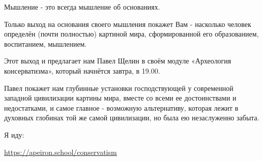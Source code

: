 Мышление - это всегда мышление об основаниях. 

Только выход на основания своего мышления покажет Вам - насколько человек
определён (почти полностью) картиной мира, сформированной его образованием,
воспитанием, мышлением.

Этот выход и предлагает нам Павел Щелин в своём модуле «Археология
консерватизма», который начнётся завтра, в 19.00.

Павел покажет нам глубинные установки господствующей у современной западной
цивилизации картины мира, вместе со всеми ее достоинствами и недостатками, и
самое главное - возможную альтернативу, которая лежит в духовных глобинах той
же самой цивилизации, но была ею незаслуженно забыта.

Я иду:

\url{https://apeiron.school/conservatism}
